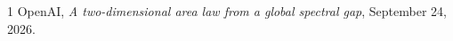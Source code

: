 \documentclass[11pt]{article}
\begin{document}

\begin{thebibliography}{1}
 OpenAI, \emph{A two-dimensional area law from a
 global spectral gap}, September 24, 2026.
\end{thebibliography}
\end{document}
